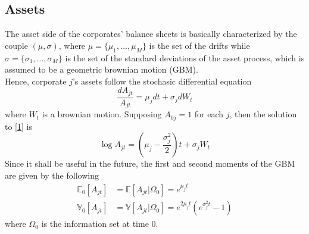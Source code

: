 \documentclass[11pt]{article}
\begin{document}
\subsection{Assets}
The asset side of the corporates' balance sheets is basically characterized by the couple $(\mu,\sigma)$, where $\mu = \{\mu_1,\dots,\mu_M\}$ is the set of the drifts while $\sigma = \{ \sigma_1,\dots,\sigma_M\}$ is the set of the standard deviations of the asset process, which is assumed to be a geometric brownian motion (GBM).\\
Hence, corporate $j$'s assets follow the stochasic differential equation
\begin{equation}\label{1}
	\frac{dA_{jt}}{A_{jt}} = \mu_j dt + \sigma_j dW_t
\end{equation}
where $W_t$ is a brownian motion. Supposing $A_{0j}=1$ for each $j$, then the solution to \eqref{1} is 
\begin{equation}\label{2}
	\log A_{jt} = \left ( \mu_j - \frac{\sigma^2_j}{2} \right )t + \sigma_j W_t
\end{equation}
Since it shall be useful in the future, the first and second moments of the GBM are given by the following
\begin{subequations}\label{3}
\begin{align}
	\mathbb{E}_0[A_{jt}] &= \mathbb{E}[A_{jt}|\Omega_0] = e^{\mu_j t}\label{3a}\\
	\mathbb{V}_0[A_{jt}] &= \mathbb{V}[A_{jt}|\Omega_0] = e^{2\mu_j t} ( e^{\sigma_j^2 t} -1)\label{3b}
\end{align}
\end{subequations}
where $\Omega_0$ is the information set at time $0$.
\end{document}
